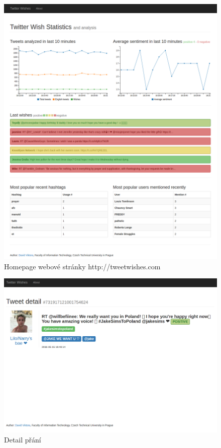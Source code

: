 \documentclass[thesis=B,czech]{FITthesis}[2012/06/26]
\begin{document}
	\begin{figure}[ht]
    	\centering
    	\includegraphics[width=1\textwidth]{images/web-homepage.png}
    	\caption{Homepage webové stránky http://tweetwishes.com}
    	\label{fig:web-homepage}
	\end{figure}
	
		
	\begin{figure}[ht]
    	\centering
    	\includegraphics[width=1\textwidth]{images/web-wish.png}
    	\caption{Detail přání}
    	\label{fig:web-wishdetail}
	\end{figure}
\end{document}
